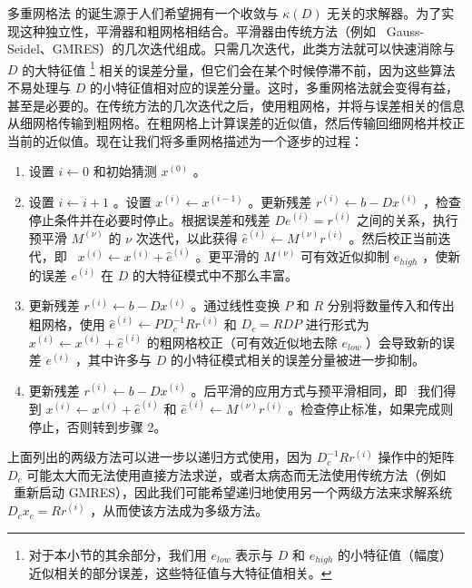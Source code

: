 \documentclass[5p,times,a4paper,fleqn]{cas-dc}
\begin{document}
多重网格法    \cite{trottenberg2000multigrid}    的诞生源于人们希望拥有一个收敛与    $\kappa(D)$    无关的求解器。为了实现这种独立性，平滑器和粗网格相结合。平滑器由传统方法（例如 \  Gauss-Seidel、GMRES）的几次迭代组成。只需几次迭代，此类方法就可以快速消除与    $D$    的大特征值    \footnote{对于本小节的其余部分，我们用    $e_{low}$    表示与    $D$    和    $e_{high}$    的小特征值（幅度）近似相关的部分误差，这些特征值与大特征值相关。  }    相关的误差分量，但它们会在某个时候停滞不前，因为这些算法不易处理与    $D$    的小特征值相对应的误差分量。这时，多重网格法就会变得有益，甚至是必要的。在传统方法的几次迭代之后，使用粗网格，并将与误差相关的信息从细网格传输到粗网格。在粗网格上计算误差的近似值，然后传输回细网格并校正当前的近似值。现在让我们将多重网格描述为一个逐步的过程：
   \begin{enumerate}

    \item   设置    $i \leftarrow 0$    和初始猜测    $x^{(0)}$    。   \item   设置    $i \leftarrow i+1$    。设置    $x^{(i)} \leftarrow x^{(i-1)}$    。更新残差    $r^{(i)} \leftarrow b - D x^{(i)}$    ，检查停止条件并在必要时停止。根据误差和残差    $D e^{(i)} = r^{(i)}$    之间的关系，执行预平滑    $M^{(\nu)}$    的    $\nu$    次迭代，以此获得    $\widehat{e}^{(i)} \leftarrow M^{(\nu)} r^{(i)}$    。然后校正当前迭代，即 \     $x^{(i)} \leftarrow x^{(i)} + \widehat{e}^{(i)}$    。更平滑的    $M^{(\nu)}$    可有效近似抑制    $e_{high}$    ，使新的误差    $e^{(i)}$    在    $D$    的大特征模式中不那么丰富。   \item   更新残差    $r^{(i)} \leftarrow b - D x^{(i)}$    。通过线性变换    $P$    和    $R$    分别将数量传入和传出粗网格，使用    $\widehat{e}^{(i)} \leftarrow P D_{c}^{-1} R r^{(i)}$    和    $D_{c} = R D P$    进行形式为    $x^{(i)} \leftarrow x^{(i)} + \widehat{e}^{(i)}$    的粗网格校正（可有效近似地去除    $e_{low}$    ）会导致新的误差    $e^{(i)}$    ，其中许多与    $D$    的小特征模式相关的误差分量被进一步抑制。   \item   更新残差    $r^{(i)} \leftarrow b - D x^{(i)}$    。后平滑的应用方式与预平滑相同，即 \  我们得到    $x^{(i)} \leftarrow x^{(i)} + \widehat{e}^{(i)}$    和    $\widehat{e}^{(i)} \leftarrow M^{(\nu)} r^{(i)}$    。检查停止标准，如果完成则停止，否则转到步骤 2。  \end{enumerate}     

上面列出的两级方法可以进一步以递归方式使用，因为    $D_{c}^{-1} R r^{(i)}$    操作中的矩阵    $D_{c}$    可能太大而无法使用直接方法求逆，或者太病态而无法使用传统方法（例如 \  重新启动 GMRES），因此我们可能希望递归地使用另一个两级方法来求解系统    $D_{c} x_{c} = R r^{(i)}$    ，从而使该方法成为多级方法。  
\end{document}
